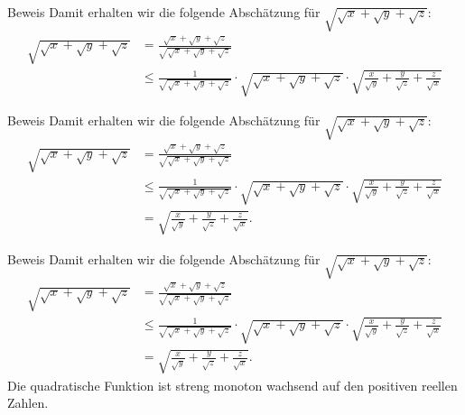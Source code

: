 \documentclass[10pt]{beamer}
\begin{document}
\begin{frame}{Beweis}
    Damit erhalten wir die folgende Abschätzung für \( \sqrt{\sqrt{x} + \sqrt{y} + \sqrt{z}} \):
    \begin{align*}
        \sqrt{\sqrt{x} + \sqrt{y} + \sqrt{z}}
        & = \frac{ \sqrt{x} + \sqrt{y} + \sqrt{z}}{\sqrt{\sqrt{x} + \sqrt{y} + \sqrt{z}}} \\
        & \leq \frac{1}{\sqrt{\sqrt{x} + \sqrt{y} + \sqrt{z}}} \cdot \sqrt{\sqrt{x} + \sqrt{y} + \sqrt{z}} \cdot \sqrt{\frac{x}{\sqrt{y}} + \frac{y}{\sqrt{z}} + \frac{z}{\sqrt{x}}}
    \end{align*}
\end{frame}



\begin{frame}{Beweis}
    Damit erhalten wir die folgende Abschätzung für \( \sqrt{\sqrt{x} + \sqrt{y} + \sqrt{z}} \):
    \begin{align*}
        \sqrt{\sqrt{x} + \sqrt{y} + \sqrt{z}}
        & = \frac{ \sqrt{x} + \sqrt{y} + \sqrt{z}}{\sqrt{\sqrt{x} + \sqrt{y} + \sqrt{z}}} \\
        & \leq \frac{1}{\sqrt{\sqrt{x} + \sqrt{y} + \sqrt{z}}} \cdot \sqrt{\sqrt{x} + \sqrt{y} + \sqrt{z}} \cdot \sqrt{\frac{x}{\sqrt{y}} + \frac{y}{\sqrt{z}} + \frac{z}{\sqrt{x}}} \\
        & = \sqrt{\frac{x}{\sqrt{y}} + \frac{y}{\sqrt{z}} + \frac{z}{\sqrt{x}}}.
    \end{align*}
\end{frame}



\begin{frame}{Beweis}
    Damit erhalten wir die folgende Abschätzung für \( \sqrt{\sqrt{x} + \sqrt{y} + \sqrt{z}} \):
    \begin{align*}
        \sqrt{\sqrt{x} + \sqrt{y} + \sqrt{z}}
        & = \frac{ \sqrt{x} + \sqrt{y} + \sqrt{z}}{\sqrt{\sqrt{x} + \sqrt{y} + \sqrt{z}}} \\
        & \leq \frac{1}{\sqrt{\sqrt{x} + \sqrt{y} + \sqrt{z}}} \cdot \sqrt{\sqrt{x} + \sqrt{y} + \sqrt{z}} \cdot \sqrt{\frac{x}{\sqrt{y}} + \frac{y}{\sqrt{z}} + \frac{z}{\sqrt{x}}} \\
        & = \sqrt{\frac{x}{\sqrt{y}} + \frac{y}{\sqrt{z}} + \frac{z}{\sqrt{x}}}.
    \end{align*}
    Die quadratische Funktion ist streng monoton wachsend auf den positiven reellen Zahlen.
\end{frame}
\end{document}
